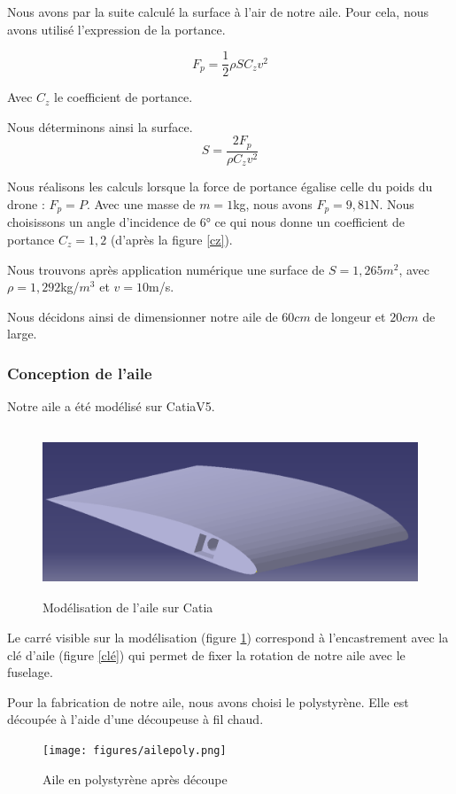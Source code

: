 \documentclass[a4paper,12pt,french]{report}
\begin{document}
Nous avons par la suite calculé la surface à l'air de notre aile. Pour cela, nous avons utilisé l'expression de la portance.

$$ F_p=\frac{1}{2}\rho S C_z v^2$$

Avec $C_z$ le coefficient de portance.

Nous déterminons ainsi la surface.
$$S=\frac{2F_p}{\rho C_z v^2}$$

Nous réalisons les calculs lorsque la force de portance égalise celle du poids du drone : $F_p=P.$ Avec une masse de $m=1$kg, nous avons $F_p=9,81$N. Nous choisissons un angle d'incidence de $6°$ ce qui nous donne un coefficient de portance $C_z=1,2$ (d'après la figure \ref{cz}).\newline

Nous trouvons après application numérique une surface de $S=1,265$$m^2$, avec $\rho=1,292$kg/$m^3$ et $v=10$m/s.\newline

    Nous décidons ainsi de dimensionner notre aile de $60cm$ de longeur et $20cm$ de large.

\subsubsection*{Conception de l'aile}

Notre aile a été modélisé sur CatiaV5.

\begin{figure}[h]
    \centering
    \includegraphics[height=5cm]{figures/ailec.png}
    \caption{Modélisation de l'aile sur Catia}
    \label{aile}
\end{figure}
\newpage

Le carré visible sur la modélisation (figure \ref{aile}) correspond à l'encastrement avec la clé d'aile (figure \ref{clé}) qui permet de fixer la rotation de notre aile avec le fuselage.\newline

Pour la fabrication de notre aile, nous avons choisi le polystyrène. Elle est découpée à l'aide d'une découpeuse à fil chaud.
\label{ailefini}
\begin{figure}[h]
    \centering
    \texttt{[image: figures/ailepoly.png]}
    \caption{Aile en polystyrène après découpe}
    \label{ailepoly}
\end{figure}
\end{document}
